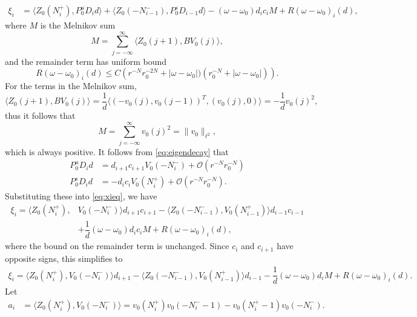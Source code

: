\documentclass[12pt,reqno]{amsart}
\begin{document}
\begin{equation}\label{eq:xieq}
\begin{aligned}
\xi_i &= \langle Z_0(N_i^+), P_0^u D_i d \rangle 
+ \langle Z_0(-N_{i-1}^-), P_0^s D_{i-1} d \rangle - (\omega - \omega_0) d_i c_i M + R(\omega - \omega_0)_i(d),
\end{aligned}
\end{equation}
where $M$ is the Melnikov sum
\[
M = \sum_{j = -\infty}^{\infty} \langle Z_0(j+1), B V_0(j)\rangle,
\]
and the remainder term has uniform bound
\begin{equation}\label{eq:Rbound}
R(\omega - \omega_0)_i(d) \leq
C \left( r^{-N} r_0^{-2N} + |\omega - \omega_0|)(r_0^{-N} + |\omega - \omega_0| )\right).
\end{equation}
For the terms in the Melnikov sum,
\[
\langle Z_0(j+1), B V_0(j)\rangle = \frac{1}{d} \langle (-v_0(j), v_0(j-1))^T, (v_0(j), 0) \rangle
= -\frac{1}{d}v_0(j)^2,
\]
thus it follows that
\begin{equation}\label{eq:M}
M = \sum_{j = -\infty}^{\infty} v_0(j)^2 = \| v_0 \|_{\ell^2},
\end{equation}
which is always positive. It follows from 
\cref{eq:eigendecay} that
\begin{align*}
P_0^u D_i d &= d_{i+1} c_{i+1} V_0(-N_i^-) + \mathcal{O}\left( r^{-N}r_0^{-N}\right) \\
P_0^s D_i d &= -d_i c_i V_0(N_i^+) + \mathcal{O}\left( r^{-N}r_0^{-N}\right).
\end{align*}
Substituting these into \cref{eq:xieq}, we have
\begin{equation*}
\begin{aligned}
\xi_i = \langle Z_0(N_i^+), &V_0(-N_i^-) \rangle d_{i+1} c_{i+1}
- \langle Z_0(-N_{i-1}^-), V_0(N_{i-1}^+) \rangle d_{i-1} c_{i-1} \\
&+ \dfrac{1}{d} (\omega - \omega_0) d_i c_i M+ R(\omega - \omega_0)_i(d),
\end{aligned}
\end{equation*}
where the bound on the remainder term is unchanged. Since $c_i$ and $c_{i+1}$ have opposite signs, this simplifies to 
\begin{align*}
\xi_i = \langle Z_0(N_i^+), V_0(-N_i^-) \rangle d_{i+1}
- \langle Z_0(-N_{i-1}^-), V_0(N_{i-1}^+) \rangle d_{i-1}
- \dfrac{1}{d} (\omega - \omega_0) d_i M
+ R(\omega - \omega_0)_i(d).
\end{align*}
Let
\begin{align*}
a_i &= \langle Z_0(N_i^+), V_0(-N_i^-) \rangle 
= v_0(N_i^+)v_0(-N_i^- - 1) - v_0(N_i^+ - 1)v_0(-N_i^-).
\end{align*}
\end{document}
